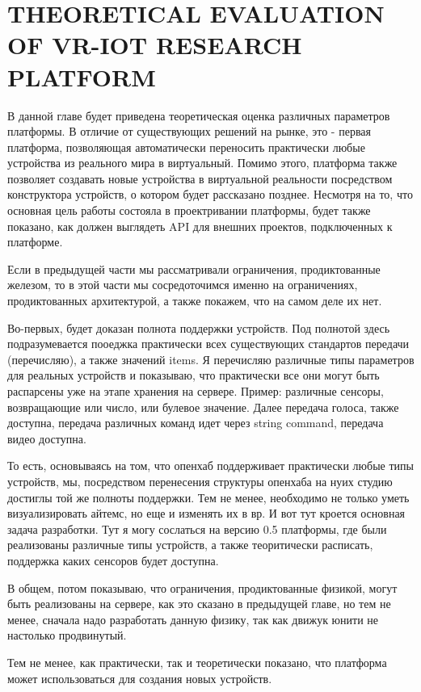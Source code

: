 
\chapter{THEORETICAL EVALUATION OF VR-IOT RESEARCH PLATFORM}
В данной главе будет приведена теоретическая оценка различных параметров платформы. В отличие от существующих решений на рынке, это - первая платформа, позволяющая автоматически переносить практически любые устройства из реального мира в виртуальный. Помимо этого, платформа также позволяет создавать новые устройства в виртуальной реальности посредством конструктора устройств, о котором будет рассказано позднее. Несмотря на то, что основная цель работы состояла в проектривании платформы, будет также показано, как должен выглядеть API для внешних проектов, подключенных к платформе.

Если в предыдущей части мы рассматривали ограничения, продиктованные железом, то в этой части мы сосредоточимся именно на ограничениях, продиктованных архитектурой, а также покажем, что на самом деле их нет.

Во-первых, будет доказан полнота поддержки устройств. Под полнотой здесь подразумевается пооеджка практически всех существующих стандартов передачи (перечисляю), а также значений items. Я перечисляю различные типы параметров для реальных устройств и показываю, что практически все они могут быть распарсены уже на этапе хранения на сервере. Пример: различные сенсоры, возвращающие или число, или булевое значение. Далее передача голоса, также доступна, передача различных команд идет через string command, передача видео доступна.

То есть, основываясь на том, что опенхаб поддерживает практически любые типы устройств, мы, посредством перенесения структуры опенхаба на нуих студию достиглы той же полноты поддержки. Тем не менее, необходимо не только уметь визуализировать айтемс, но еще и изменять их в вр. И вот тут кроется основная задача разработки. Тут я могу сослаться на версию 0.5 платформы, где были реализованы различные типы устройств, а также теоритически расписать, поддержка каких сенсоров будет доступна.

В общем, потом показываю, что ограничения, продиктованные физикой, могут быть реализованы на сервере, как это сказано в предыдущей главе, но тем не менее, сначала надо разработать данную физику, так как движук юнити не настолько продвинутый.

Тем не менее, как практически, так и теоретически показано, что платформа может использоваться для создания новых устройств.